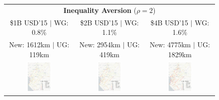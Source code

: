 \documentclass[a4paper]{article}
\begin{document}
\begin{figure}[H]
{\begin{tabular}{@{}c@{}c@{}c@{}}
\multicolumn{3}{c}{\textbf{Inequality Aversion} ($\rho = 2$)} \\ [0.5em]
\$1B USD'15 $|$ WG: 0.8\% & \$2B USD'15 $|$ WG: 1.1\% & \$4B USD'15 $|$ WG: 1.6\%  \\
New: 1612km $|$ UG: 119km & New: 2954km $|$ UG: 419km & New: 4775km $|$ UG: 1829km \\ 
\includegraphics[width=0.38\textwidth, trim= {0.9cm 0 0.9cm 0}, clip]{"../figures/GE/trans_africa_network_GE_add_20g_1b_fixed_cgc_sigma3.8_rho2_julia_MACR_90kmh_google_perc_ug.pdf"} & 
\includegraphics[width=0.38\textwidth, trim= {0.9cm 0 0.9cm 0}, clip]{"../figures/GE/trans_africa_network_GE_add_20g_2b_fixed_cgc_sigma3.8_rho2_julia_MACR_90kmh_google_perc_ug.pdf"} &
\includegraphics[width=0.38\textwidth, trim= {0.9cm 0 0.9cm 0}, clip]{"../figures/GE/trans_africa_network_GE_add_20g_4b_fixed_cgc_sigma3.8_rho2_julia_MACR_90kmh_google_perc_ug.pdf"}  \\

\end{tabular}}
\end{figure}
\end{document}
